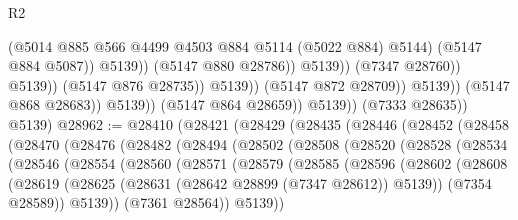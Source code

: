 \begin{lexlean}{R2}
\begin{coremodule}
                                                  (@5014
                                                    @885
                                                    @566
                                                    @4499
                                                    @4503
                                                    @884
                                                    @5114
                                                    (@5022 @884)
                                                    @5144)
                                                  (@5147 @884 @5087))
                                                @5139))
                                            (@5147 @880 @28786))
                                          @5139))
                                      (@7347 @28760))
                                    @5139))
                                (@5147 @876 @28735))
                              @5139))
                          (@5147 @872 @28709))
                        @5139))
                    (@5147 @868 @28683))
                  @5139))
              (@5147 @864 @28659))
            @5139))
        (@7333 @28635))
      @5139)
@28962 := @28410
    (@28421
      (@28429
        (@28435
          (@28446
            (@28452
              (@28458
                (@28470
                  (@28476
                    (@28482
                      (@28494
                        (@28502
                          (@28508
                            (@28520
                              (@28528
                                (@28534
                                  (@28546
                                    (@28554
                                      (@28560
                                        (@28571
                                          (@28579
                                            (@28585
                                              (@28596
                                                (@28602
                                                  (@28608
                                                    (@28619
                                                      (@28625
                                                        (@28631
                                                          (@28642 @28899 (@7347 @28612))
                                                          @5139))
                                                      (@7354 @28589))
                                                    @5139))
                                                (@7361 @28564))
                                              @5139))

\end{coremodule}
\end{lexlean}
